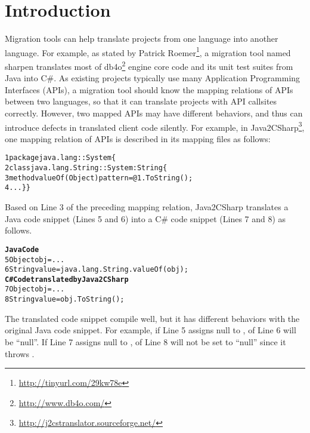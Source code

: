 \section{Introduction}
\label{sec:introduction}

Migration tools can help translate projects from one language into another language. For example, as stated by Patrick Roemer\footnote{\url{http://tinyurl.com/29kw78e}}, a migration tool named sharpen translates most of db4o\footnote{\url{http://www.db4o.com/}} engine core code and its unit test suites from Java into C\#. As existing projects typically use many Application Programming Interfaces (APIs), a migration tool should know the mapping relations of APIs between two languages, so that it can translate projects with API callsites correctly. However, two mapped APIs may have different behaviors, and thus can introduce defects in translated client code silently. For example, in Java2CSharp\footnote{\url{http://j2cstranslator.sourceforge.net/}}, one mapping relation of APIs is described in its mapping files as follows:

\begin{CodeOut}%
\begin{alltt}
1 package java.lang::System\{
2  class java.lang.String :: System:String\{
3   method valueOf(Object) { pattern = @1.ToString(); }
4   ...\}\}
\end{alltt}
\end{CodeOut}

Based on Line 3 of the preceding mapping relation, Java2CSharp translates a Java code snippet (Lines 5 and 6) into a C\# code snippet (Lines 7 and 8) as follows.

\begin{CodeOut}%
\begin{alltt}
\textbf{  Java Code}
5 Object obj = ...
6 String value = java.lang.String.valueOf(obj);
\textbf{  C# Code translated by Java2CSharp}
7 Object obj = ...
8 String value = obj.ToString();
\end{alltt}
\end{CodeOut}

The translated code snippet compile well, but it has different behaviors with the original Java code snippet. For example, if Line 5 assigns null to ,  of Line 6 will be ``null''. If Line 7 assigns null to ,  of Line 8 will not be set to ``null'' since it throws .


